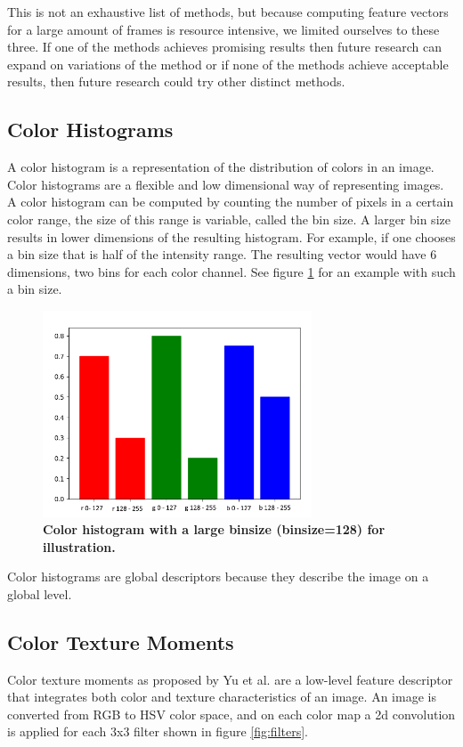 \documentclass{article}
\begin{document}
This is not an exhaustive list of methods, but because computing feature vectors for a large amount of frames is resource intensive, we limited ourselves to these three. If one of the methods achieves promising results then future research can expand on variations of the method or if none of the methods achieve acceptable results, then future research could try other distinct methods.

\subsection{Color Histograms}
A color histogram is a representation of the distribution of colors in an image. Color histograms are a flexible and low dimensional way of representing images. A color histogram can be computed by counting the number of pixels in a certain color range, the size of this range is variable, called the bin size. A larger bin size results in lower dimensions of the resulting histogram. For example, if one chooses a bin size that is half of the intensity range. The resulting vector would have 6 dimensions, two bins for each color channel. See figure \ref{fig:colorhistogram} for an example with such a bin size.
\begin{figure}[H]
	\includegraphics[width=8cm]{images/colorhistogram.png}
	\centering
	\caption{\textbf{Color histogram with a large binsize (binsize=128) for illustration.}}
	\label{fig:colorhistogram}
\end{figure}
Color histograms are global descriptors because they describe the image on a global level.

\subsection{Color Texture Moments}
Color texture moments as proposed by Yu et al. \cite{yu2002colortexturemoments} are a low-level feature descriptor that integrates both color and texture characteristics of an image. An image is converted from RGB to HSV color space, and on each color map a 2d convolution is applied for each 3x3 filter shown in figure \ref{fig:filters}.
\end{document}
